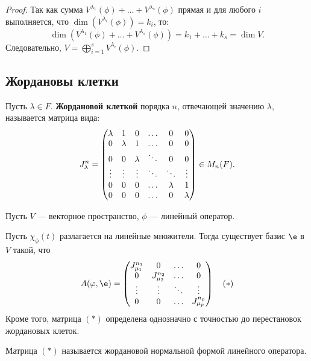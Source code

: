 \begin{proof}
	Так как сумма $ V^{\lambda_1}(\phi) + \ldots +  V^{\lambda_s}(\phi)$ прямая и для любого $i$ выполняется, что $\dim(V^{\lambda_i}(\phi)) = k_i$, то: 
	$$
	\dim(V^{\lambda_1}(\phi) + \ldots +  V^{\lambda_s}(\phi)) = k_1 + \ldots + k_s = \dim{V}.
	$$
	Следовательно, $V = \bigoplus_{i = 1}^s  V^{\lambda_i}(\phi)$.
\end{proof}

\subsection*{Жордановы клетки}
\begin{Def}
Пусть $\lambda \in F$. \textbf{Жордановой клеткой} порядка $n$, отвечающей значению $\lambda$, называется матрица вида:
\begin{gather*}
J_\lambda^n = 
\begin{pmatrix}
\lambda & 1 & 0 & \ldots & 0 & 0 \\
0 & \lambda & 1 & \ldots & 0 & 0 \\
0 & 0 & \lambda & \ddots & 0 & 0 \\
\vdots & \vdots & \vdots & \ddots & \ddots & \vdots \\
0 & 0 & 0 & \ldots & \lambda & 1 \\
0 & 0 & 0 & \ldots & 0 & \lambda
\end{pmatrix} \in M_n(F).
\end{gather*}
\end{Def}

Пусть $V$ --- векторное пространство, $\phi$ --- линейный оператор.

\begin{Theorem}
Пусть $\chi_\phi(t)$ разлагается на линейные множители. Тогда существует базис $\e$ в $V$ такой, что 
\begin{gather*}
A(\phi, \e) = 
\begin{pmatrix*}
J_{\mu_1}^{n_1} & 0 & \ldots & 0 \\
0 & J_{\mu_2}^{n_2} & \ldots & 0 \\
\vdots & \vdots & \ddots & \vdots \\
0 & 0 & \ldots & J_{\mu_p}^{n_p}
\end{pmatrix*} \quad (*)
\end{gather*}
Кроме того, матрица $(*)$ определена однозначно с точностью до перестановок жордановых клеток.
\end{Theorem}

\begin{Def}
Матрица $(*)$ называется жордановой нормальной формой линейного оператора.
\end{Def}

